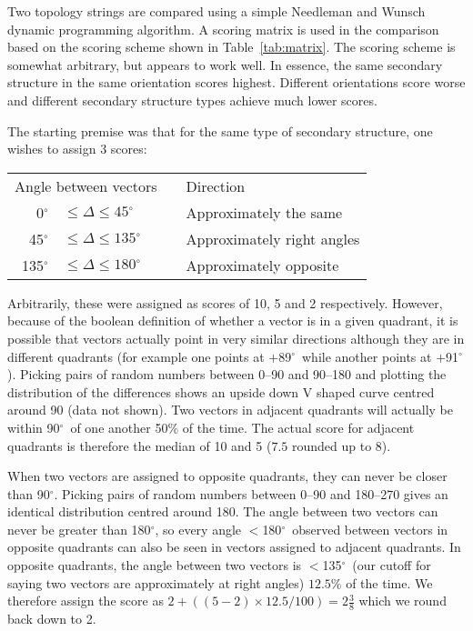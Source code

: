 \documentclass{article}
\newcommand{\degrees}{\mbox{${}^{\circ}$}}
\begin{document}
Two topology strings are compared using a simple Needleman and Wunsch
dynamic programming algorithm. A scoring matrix is used in the
comparison based on the scoring scheme shown in
Table~\ref{tab:matrix}. The scoring scheme is somewhat arbitrary, but
appears to work well.  In essence, the same secondary structure in the
same orientation scores highest. Different orientations score worse
and different secondary structure types achieve much lower scores.

The starting premise was that for the same type of secondary
structure, one wishes to assign 3 scores: 
\begin{center}
\begin{tabular}{rlll}
\multicolumn{2}{l}{Angle between vectors}&\hspace{1cm}& Direction  \\
0\degrees   & $\le\Delta\le 45\degrees$     && Approximately the same \\
45\degrees  & $\le\Delta\le 135\degrees$    && Approximately right angles \\
135\degrees & $\le\Delta\le 180\degrees$    && Approximately opposite \\
\end{tabular}
\end{center}
\noindent Arbitrarily, these were assigned as scores of 10, 5 and 2
respectively. However, because of the boolean definition of whether a
vector is in a given quadrant, it is possible that vectors actually
point in very similar directions although they are in different
quadrants (for example one points at $+$89\degrees\ while another
points at $+$91\degrees). Picking pairs of random numbers between
0--90 and 90--180 and plotting the distribution of the differences
shows an upside down V shaped curve centred around 90
(data not shown). Two vectors in adjacent quadrants will
actually be within 90\degrees\ of one another 50\% of the time. The
actual score for adjacent quadrants is therefore the median of 10 and
5 ($7.5$ rounded up to 8).


When two vectors are assigned to opposite quadrants, they can never be
closer than 90\degrees. Picking pairs of random numbers between 0--90
and 180--270 gives an identical distribution centred around 180. The
angle between two vectors can never be greater than 180\degrees, so
every angle $<$180\degrees\ observed between vectors in opposite
quadrants can also be seen in vectors assigned to adjacent quadrants.
In opposite quadrants, the angle between two vectors is
$<$135\degrees\ (our cutoff for saying two vectors are approximately
at right angles) $12.5$\% of the time. We therefore assign the score
as $2+((5-2)\times 12.5/100) = 2\frac{3}{8}$ which we round back down
to 2.
\end{document}
